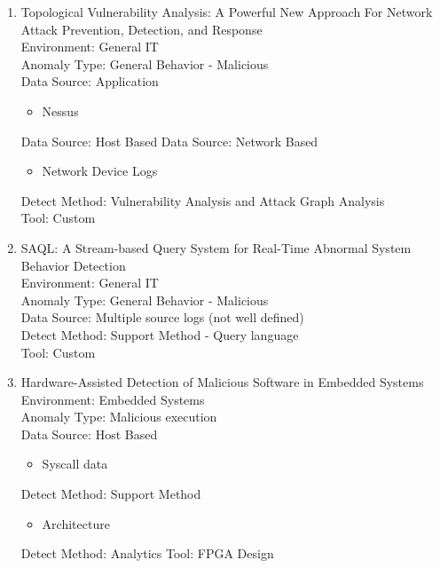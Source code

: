 \documentclass[10pt]{IEEEtran}
\begin{document}
\begin{enumerate}
    \item 
    Topological Vulnerability Analysis: A Powerful New Approach For Network Attack Prevention, Detection, and Response\cite{jajodia2009topological}\\
    Environment: General IT\\
    Anomaly Type: General Behavior - Malicious \\
    Data Source: Application
    \begin{itemize}
        \item Nessus
    \end{itemize}
    Data Source: Host Based
    Data Source: Network Based
    \begin{itemize}
        \item Network Device Logs
    \end{itemize}
    Detect Method: Vulnerability Analysis and Attack Graph Analysis\\ 
    Tool: Custom
    
    \item 
    SAQL: A Stream-based Query System for Real-Time Abnormal System Behavior Detection\cite{gao2018saql}\\
    Environment: General IT\\
    Anomaly Type: General Behavior - Malicious \\
    Data Source: Multiple source logs (not well defined)\\
    Detect Method: Support Method - Query language\\ 
    Tool: Custom
    
    \item 
    Hardware-Assisted Detection of Malicious Software in Embedded Systems\cite{rahmatian2012hardware}\\
    Environment: Embedded Systems\\
    Anomaly Type: Malicious execution \\
    Data Source: Host Based
    \begin{itemize}
        \item Syscall data
    \end{itemize}
    Detect Method: Support Method 
    \begin{itemize}
        \item Architecture
    \end{itemize}
    Detect Method: Analytics
    Tool: FPGA Design
    

\end{enumerate}
\end{document}
